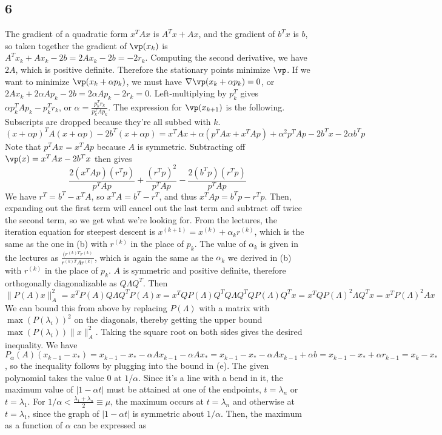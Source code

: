 \documentclass{article}
\begin{document}
\subsection*{6}
The gradient of a quadratic form $x^TAx$ is $A^Tx+Ax$, and the gradient of $b^Tx$ is $b$, so taken together the gradient of $\vp(x_k)$ is $A^Tx_k+Ax_k-2b=2Ax_k-2b=-2r_k$. Computing the second derivative, we have $2A$, which is positive definite. Therefore the stationary points minimize $\vp$.
If we want to minimize $\vp(x_k+\alpha p_k)$, we must have $\nabla\vp(x_k+\alpha p_k)=0$, or $2Ax_k+2\alpha Ap_k-2b=2\alpha Ap_k-2r_k=0$. Left-multiplying by $p_k^T$ gives $\alpha p_k^TAp_k-p_k^Tr_k$, or $\alpha=\frac{p_k^Tr_k}{p_k^TAp_k}$.
The expression for $\vp(x_{k+1})$ is the following. Subscripts are dropped because they're all subbed with $k$.
\[(x+\alpha p)^TA(x+\alpha p)-2b^T(x+\alpha p)=x^TAx+\alpha(p^TAx+x^TAp)+\alpha^2p^TAp-2b^Tx-2\alpha b^Tp\]
Note that $p^TAx=x^TAp$ because $A$ is symmetric. Subtracting off $\vp(x)=x^TAx-2b^Tx$ then gives
\[\frac{2(x^TAp)(r^Tp)}{p^TAp}+\frac{(r^Tp)^2}{p^TAp}-\frac{2(b^Tp)(r^Tp)}{p^TAp}\]
We have $r^T=b^T-x^TA$, so $x^TA=b^T-r^T$, and thus $x^TAp=b^Tp-r^Tp$. Then, expanding out the first term will cancel out the last term and subtract off twice the second term, so we get what we're looking for.
From the lectures, the iteration equation for steepest descent is $x^{(k+1)}=x^{(k)}+\alpha_kr^{(k)}$, which is the same as the one in (b) with $r^{(k)}$ in the place of $p_k$. The value of $\alpha_k$ is given in the lectures as $\frac{(r^{(k)T}r^{(k)}}{r^{(k)T}Ar^{(k)}}$, which is again the same as the $\alpha_k$ we derived in (b) with $r^{(k)}$ in the place of $p_k$.
$A$ is symmetric and positive definite, therefore orthogonally diagonalizable as $Q\Lambda Q^T$. Then 
\[\|P(A)x\|_A^2=x^TP(A)Q\Lambda Q^TP(A)x=x^TQP(\Lambda)Q^TQ\Lambda Q^TQP(\Lambda)Q^Tx=x^TQP(\Lambda)^2\Lambda Q^Tx=x^TP(\Lambda)^2Ax\]
We can bound this from above by replacing $P(\Lambda)$ with a matrix with $\max(P(\lambda_i))^2$ on the diagonals, thereby getting the upper bound $\max(P(\lambda_i))\|x\|_A^2$. Taking the square root on both sides gives the desired inequality.
We have $P_\alpha(A)(x_{k-1}-x_*)=x_{k-1}-x_*-\alpha Ax_{k-1}-\alpha Ax_*=x_{k-1}-x_*-\alpha Ax_{k-1}+\alpha b=x_{k-1}-x_*+\alpha r_{k-1}=x_k-x_*$, so the inequality follows by plugging into the bound in (e).
The given polynomial takes the value $0$ at $1/\alpha$. Since it's a line with a bend in it, the maximum value of $|1-\alpha t|$ must be attained at one of the endpoints, $t=\lambda_n$ or $t=\lambda_1$. For $1/\alpha<\frac{\lambda_1+\lambda_n}{2}\equiv \mu$, the maximum occurs at $t=\lambda_n$ and otherwise at $t=\lambda_1$, since the graph of $|1-\alpha t|$ is symmetric about $1/\alpha$. Then, the maximum as a function of $\alpha$ can be expressed as
\end{document}
